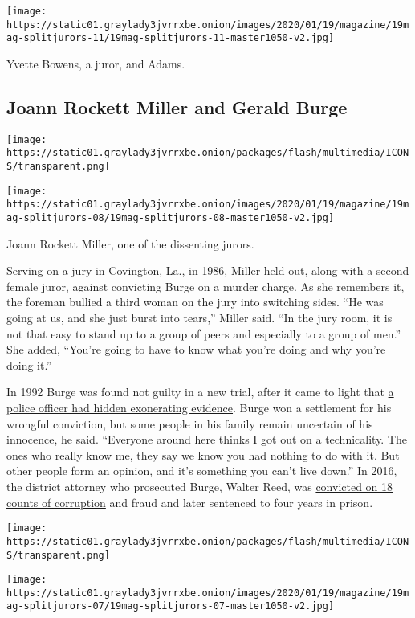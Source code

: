 \texttt{[image: https://static01.graylady3jvrrxbe.onion/images/2020/01/19/magazine/19mag-splitjurors-11/19mag-splitjurors-11-master1050-v2.jpg]}

Yvette Bowens, a juror, and Adams.

\hypertarget{joann-rockett-miller-and-gerald-burge}{%
\subsection{Joann Rockett Miller and Gerald
Burge}\label{joann-rockett-miller-and-gerald-burge}}

\texttt{[image: https://static01.graylady3jvrrxbe.onion/packages/flash/multimedia/ICONS/transparent.png]}

\texttt{[image: https://static01.graylady3jvrrxbe.onion/images/2020/01/19/magazine/19mag-splitjurors-08/19mag-splitjurors-08-master1050-v2.jpg]}

Joann Rockett Miller, one of the dissenting jurors.

Serving on a jury in Covington, La., in 1986, Miller held out, along
with a second female juror, against convicting Burge on a murder charge.
As she remembers it, the foreman bullied a third woman on the jury into
switching sides. ``He was going at us, and she just burst into tears,''
Miller said. ``In the jury room, it is not that easy to stand up to a
group of peers and especially to a group of men.'' She added, ``You're
going to have to know what you're doing and why you're doing it.''

In 1992 Burge was found not guilty in a new trial, after it came to
light that
\href{https://caselaw.findlaw.com/la-supreme-court/1555524.html}{a
police officer had hidden exonerating evidence}. Burge won a settlement
for his wrongful conviction, but some people in his family remain
uncertain of his innocence, he said. ``Everyone around here thinks I got
out on a technicality. The ones who really know me, they say we know you
had nothing to do with it. But other people form an opinion, and it's
something you can't live down.'' In 2016, the district attorney who
prosecuted Burge, Walter Reed, was
\href{https://www.nola.com/news/courts/article_08cb561f-eadc-579f-9cb2-3f023cbe3575.html}{convicted
on 18 counts of corruption} and fraud and later sentenced to four years
in prison.

\texttt{[image: https://static01.graylady3jvrrxbe.onion/packages/flash/multimedia/ICONS/transparent.png]}

\texttt{[image: https://static01.graylady3jvrrxbe.onion/images/2020/01/19/magazine/19mag-splitjurors-07/19mag-splitjurors-07-master1050-v2.jpg]}

